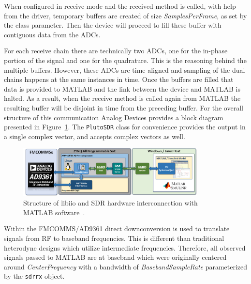 \documentclass[letterpaper,12pt]{article}
\begin{document}
When configured in receive mode and the received method is called, with help from the driver, temporary buffers are created of size \textit{SamplesPerFrame}, as set by the class parameter. Then the device will proceed to fill these buffer with contiguous data from the ADCs. 


For each receive chain there are technically two ADCs, one for the in-phase portion of the signal and one for the quadrature. This is the reasoning behind the multiple buffers.  However, these ADCs are time aligned and sampling of the dual chains happens at the same instances in time.  Once the buffers are filled that data is provided to MATLAB and the link between the device and MATLAB is halted.  As a result, when the receive method is called again from MATLAB the resulting buffer will be disjoint in time from the preceding buffer. For the overall structure of this communication Analog Devices provides a block diagram presented in Figure~\ref{fig:libiio}. The \texttt{PlutoSDR} class for convenience provides the output in a single complex vector, and accepts complex vectors as well.\par
%
\begin{figure}[htp!]
\centering
\includegraphics[width=0.85\textwidth]{sys_obj.png}
\caption{Structure of libiio and SDR hardware interconnection with MATLAB software~\cite{libiio}.}\label{fig:libiio}
\end{figure}
%
Within the FMCOMMS/AD9361 direct downconversion is used to translate signals from RF to baseband frequencies. This is different than traditional heterodyne designs which utilize intermediate frequencies. Therefore, all observed signals passed to MATLAB are at baseband which were originally centered around \textit{CenterFrequency} with a bandwidth of \textit{BasebandSampleRate} parameterized by the \texttt{sdrrx} object.
%
\end{document}
